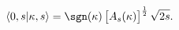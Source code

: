 \begin{equation*}
\langle 0,s|\kappa,s\rangle=\sgn(\kappa)\,\bigl[A_s(\kappa)\bigr]^{\frac12}\,\sqrt{2s}.
\end{equation*}

